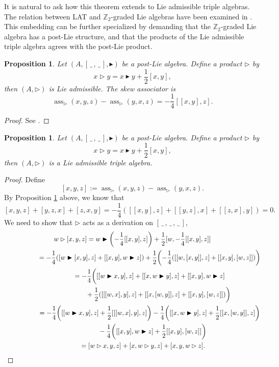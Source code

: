 \documentclass[10pt,a4paper]{amsart}
\newcommand{\noarg}{\,\_\,}
\numberwithin{equation}{section}
\newtheorem{Proposition}[Theorem]{Proposition}
 { \theoremstyle{definition}
\newtheorem{Definition}[Theorem]{Definition}
\newtheorem{Note}[Theorem]{Note}
\newtheorem{Example}[Theorem]{Example}
\newtheorem{Remark}[Theorem]{Remark} }
\begin{document}
It is natural to ask how this theorem extends to Lie admissible triple algebras. The relation between LAT and $\mathbb{Z}_2$-graded Lie algebras have been examined in \cite{GS_00,Sokolov_17}. This embedding can be further specialized by demanding that the $\mathbb{Z}_2$-graded Lie algebra has a post-Lie structure, and that the products of the Lie admissible triple algebra agrees with the post-Lie product.

\begin{Proposition}\label{prop:Lie_adm_in_psot-Lie}
Let $(A,[\noarg,\noarg],\blacktriangleright)$ be a post-Lie algebra. Define a product $\rhd$ by
\[
x \rhd y = x \blacktriangleright y + \frac{1}{2}[x,y],
\]
then $(A,\rhd)$ is Lie admissible. The skew associator is
\[
\operatorname{ass}_{\rhd}(x,y,z) - \operatorname{ass}_{\rhd}(y,x,z) = - \frac{1}{4}[[x,y],z].
\]
\end{Proposition}

\begin{proof}
See \cite[Proposition 2.7]{MK_Lundervold_2013}.
\end{proof}


\begin{Proposition}
Let $(A,[\noarg,\noarg],\blacktriangleright)$ be a post-Lie algebra. Define a product $\rhd$ by
\[
x \rhd y = x \blacktriangleright y + \frac{1}{2}[x,y],
\]
then $(A,\rhd)$ is a Lie admissible triple algebra.
\end{Proposition}

\begin{proof}
Define
\[
[x,y,z] := \operatorname{ass}_{\rhd}(x,y,z) - \operatorname{ass}_{\rhd}(y,x,z).
\]
By Proposition \ref{prop:Lie_adm_in_psot-Lie} above, we know that
\[
[x,y,z]+[y,z,x] + [z,x,y] = -\frac{1}{4}([[x,y],z]+[[y,z],x] + [[z,x],y] ) = 0.
\]
We need to show that $\rhd$ acts as a derivation on $[\noarg,\noarg,\noarg]$,
\begin{gather*}
 w \rhd [x,y,z] = w \blacktriangleright \biggl(-\frac{1}{4}[[x,y],z]\biggr) + \frac{1}{2}[w , -\frac{1}{4}[[x,y],z]] \\ \hphantom{w \rhd [x,y,z] }{}
 = -\frac{1}{4} ([w \blacktriangleright [x,y], z] + [[x,y],w\blacktriangleright z] ) +\frac{1}{2} \biggl(-\frac{1}{4} ([[w,[x,y]],z] + [[x,y],[w,z]] ) \biggr) \\ \hphantom{w \rhd [x,y,z] }{}
 = -\frac{1}{4} \biggl( [[w \blacktriangleright x,y], z] + [[x, w\blacktriangleright y],z] + [[x,y],w\blacktriangleright z] \\ \hphantom{w \rhd [x,y,z] =-\frac{1}{4}}{}
 +\frac{1}{2} ([[[w,x],y],z] + [[x,[w,y]],z] + [[x,y],[w,z]] ) \biggr) \\ \hphantom{w \rhd [x,y,z] }{}
 = -\frac{1}{4} \biggl([[w \blacktriangleright x,y], z] + \frac{1}{2}[[[w,x],y],z] \biggr) - \frac{1}{4} \biggl([[x, w\blacktriangleright y],z] +\frac{1}{2}[[x,[w,y]],z] \biggr) \\ \hphantom{w \rhd [x,y,z] =}{}
 - \frac{1}{4} \biggl( [[x,y],w\blacktriangleright z]+\frac{1}{2}[[x,y],[w,z]] \biggr) \\ \hphantom{w \rhd [x,y,z] }{}
 = [w\rhd x ,y,z] + [x,w\rhd y,z] + [x,y,w\rhd z].
\tag*{\qed}
\end{gather*}
\renewcommand{\qed}{}
\end{proof}
\end{document}
